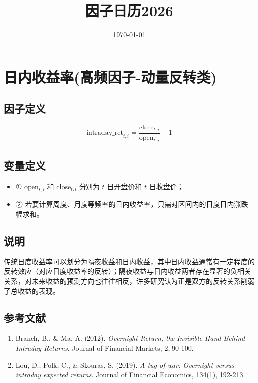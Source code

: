 \documentclass{article}
\title{因子日历2026}
\date{\today}
\begin{document}
\maketitle

\section{日内收益率(高频因子-动量反转类)}

\subsection{因子定义}
\begin{equation}
    \mathrm{intraday\_ret}_{t,i} = \frac{\mathrm{close}_{t,i}}{\mathrm{open}_{t,i}} - 1
\end{equation}

\subsection{变量定义}
\begin{itemize}
    \item ① \( \mathrm{open}_{t,i} \) 和 \( \mathrm{close}_{t,i} \) 分别为 \( t \) 日开盘价和 \( t \) 日收盘价；
    \item ② 若要计算周度、月度等频率的日内收益率，只需对区间内的日度日内涨跌幅求和。
\end{itemize}

\subsection{说明}
传统日度收益率可以划分为隔夜收益和日内收益，其中日内收益通常有一定程度的反转效应（对应日度收益率的反转）；隔夜收益与日内收益两者存在显著的负相关关系，对未来收益的预测方向也往往相反，许多研究认为正是双方的反转关系削弱了总收益的表现。

\subsection{参考文献}
\begin{enumerate}
    \item Branch, B., \& Ma, A. (2012). \textit{Overnight Return, the Invisible Hand Behind Intraday Returns}. Journal of Financial Markets, 2, 90-100.
    \item Lou, D., Polk, C., \& Skouras, S. (2019). \textit{A tug of war: Overnight versus intraday expected returns}. Journal of Financial Economics, 134(1), 192-213.
\end{enumerate}
\end{document}
